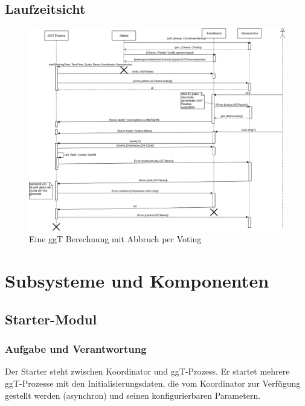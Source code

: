 \documentclass{article}
\begin{document}
\subsection{Laufzeitsicht}
\begin{figure}[H]
    \centering
    \includegraphics[width=1.0\textwidth]{sequence-diagram.png}
    \caption[seq-dia]{Eine ggT Berechnung mit Abbruch per Voting}
    \label{fig:component-diagram}
\end{figure}

\newpage

\section{Subsysteme und Komponenten}

\subsection{Starter-Modul}
\subsubsection{Aufgabe und Verantwortung}
Der Starter steht zwischen Koordinator und ggT-Prozess. Er startet mehrere ggT-Prozesse mit den Initialisierungsdaten,
die vom Koordinator zur Verfügung gestellt werden (asynchron) und seinen konfigurierbaren Parametern.
\end{document}
